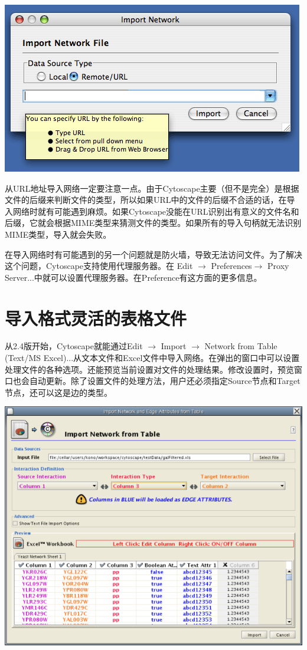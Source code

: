 \begin{center}
 \includegraphics[width=.6\textwidth]{images/network_import_dialog2_25.png} 
\end{center}

从URL地址导入网络一定要注意一点。由于Cytoscape主要（但不是完全）是根据文件的后缀来判断文件的类型，所以如果URL中的文件的后缀不合适的话，在导入网络时就有可能遇到麻烦。如果Cytoscape没能在URL识别出有意义的文件名和后缀，它就会根据MIME类型来猜测文件的类型。如果所有的导入句柄就无法识别MIME类型，导入就会失败。

在导入网络时有可能遇到的另一个问题就是防火墙，导致无法访问文件。为了解决这个问题，Cytoscape支持使用代理服务器。在 Edit $\rightarrow$ Preferences$\rightarrow$ Proxy Server...中就可以设置代理服务器。在Preference有这方面的更多信息。

\section{导入格式灵活的表格文件}
\label{free-format table}
从2.4版开始，Cytoscape就能通过Edit $\rightarrow$ Import $\rightarrow$ Network from Table (Text/MS Excel)...从文本文件和Excel文件中导入网络。在弹出的窗口中可以设置处理文件的各种选项。还能预览当前设置对文件的处理结果。修改设置时，预览窗口也会自动更新。除了设置文件的处理方法，用户还必须指定Source节点和Target节点，还可以这是边的类型。

\begin{center}
 \includegraphics[width=.8\textwidth]{images/network_table_import.png} 
\end{center}

